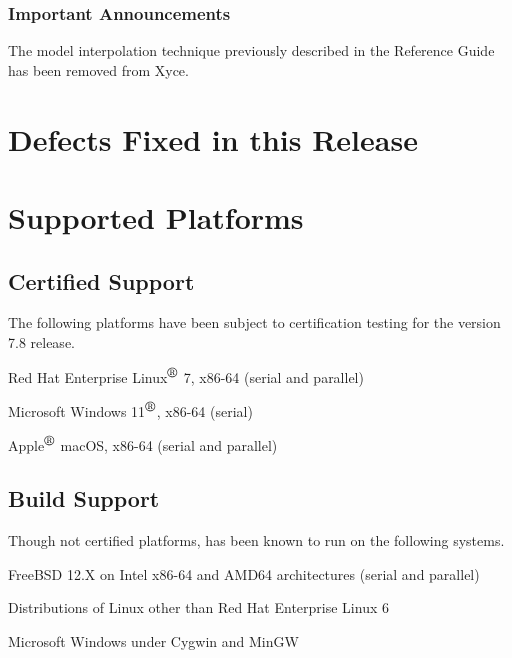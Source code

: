 \documentclass[letterpaper]{scrartcl}
\begin{document}
\subsubsection*{Important Announcements}
\begin{XyceItemize}
\item The model interpolation technique previously described in the \Xyce{}
  Reference Guide has been removed from Xyce.
\end{XyceItemize}

\newpage
\section{Defects Fixed in this Release}


\newpage
\section{Supported Platforms}
\subsection*{Certified Support}
The following platforms have been subject to certification testing for the
\Xyce{} version 7.8 release.
\begin{XyceItemize}
  \item Red Hat Enterprise Linux${}^{\mbox{\textregistered}}$ 7, x86-64 (serial and parallel)
  \item Microsoft Windows 11${}^{\mbox{\textregistered}}$, x86-64 (serial)
  \item Apple${}^{\mbox{\textregistered}}$ macOS, x86-64 (serial and parallel)
\end{XyceItemize}


\subsection*{Build Support}
Though not certified platforms, \Xyce{} has been known to run on the following
systems.
\begin{XyceItemize}
  \item FreeBSD 12.X on Intel x86-64 and AMD64 architectures (serial
    and parallel)
  \item Distributions of Linux other than Red Hat Enterprise Linux 6
  \item Microsoft Windows under Cygwin and MinGW
\end{XyceItemize}
\end{document}

